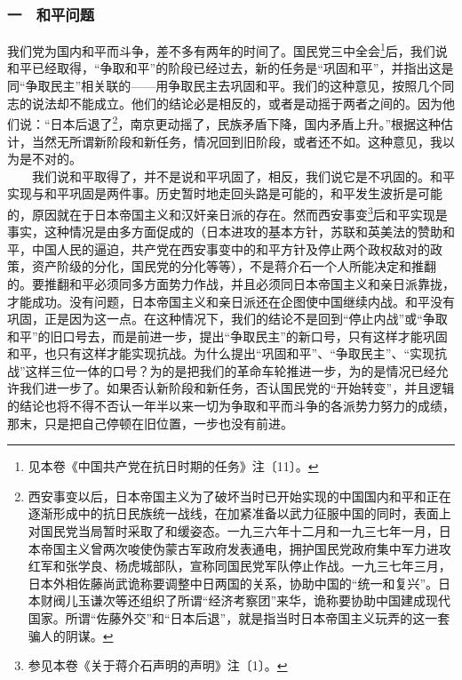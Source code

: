\documentclass[cn,11pt,chinese]{elegantbook}
\def\myformat#1{\hfil\hfil #1}
\begin{document}
\subsubsection*{\myformat{一　和平问题 }}
我们党为国内和平而斗争，差不多有两年的时间了。国民党三中全会\footnote[1]{ 见本卷《中国共产党在抗日时期的任务》注〔11〕。}后，我们说和平已经取得，“争取和平”的阶段已经过去，新的任务是“巩固和平”，并指出这是同“争取民主”相关联的——用争取民主去巩固和平。我们的这种意见，按照几个同志的说法却不能成立。他们的结论必是相反的，或者是动摇于两者之间的。因为他们说：“日本后退了\footnote[2]{ 西安事变以后，日本帝国主义为了破坏当时已开始实现的中国国内和平和正在逐渐形成中的抗日民族统一战线，在加紧准备以武力征服中国的同时，表面上对国民党当局暂时采取了和缓姿态。一九三六年十二月和一九三七年一月，日本帝国主义曾两次唆使伪蒙古军政府发表通电，拥护国民党政府集中军力进攻红军和张学良、杨虎城部队，宣称同国民党军队停止作战。一九三七年三月，日本外相佐藤尚武诡称要调整中日两国的关系，协助中国的“统一和复兴”。日本财阀儿玉谦次等还组织了所谓“经济考察团”来华，诡称要协助中国建成现代国家。所谓“佐藤外交”和“日本后退”，就是指当时日本帝国主义玩弄的这一套骗人的阴谋。}，南京更动摇了，民族矛盾下降，国内矛盾上升。”根据这种估计，当然无所谓新阶段和新任务，情况回到旧阶段，或者还不如。这种意见，我以为是不对的。\\
　　我们说和平取得了，并不是说和平巩固了，相反，我们说它是不巩固的。和平实现与和平巩固是两件事。历史暂时地走回头路是可能的，和平发生波折是可能的，原因就在于日本帝国主义和汉奸亲日派的存在。然而西安事变\footnote[3]{ 参见本卷《关于蒋介石声明的声明》注〔1〕。}后和平实现是事实，这种情况是由多方面促成的（日本进攻的基本方针，苏联和英美法的赞助和平，中国人民的逼迫，共产党在西安事变中的和平方针及停止两个政权敌对的政策，资产阶级的分化，国民党的分化等等），不是蒋介石一个人所能决定和推翻的。要推翻和平必须同多方面势力作战，并且必须同日本帝国主义和亲日派靠拢，才能成功。没有问题，日本帝国主义和亲日派还在企图使中国继续内战。和平没有巩固，正是因为这一点。在这种情况下，我们的结论不是回到“停止内战”或“争取和平”的旧口号去，而是前进一步，提出“争取民主”的新口号，只有这样才能巩固和平，也只有这样才能实现抗战。为什么提出“巩固和平”、“争取民主”、“实现抗战”这样三位一体的口号？为的是把我们的革命车轮推进一步，为的是情况已经允许我们进一步了。如果否认新阶段和新任务，否认国民党的“开始转变”，并且逻辑的结论也将不得不否认一年半以来一切为争取和平而斗争的各派势力努力的成绩，那末，只是把自己停顿在旧位置，一步也没有前进。\\
\end{document}
